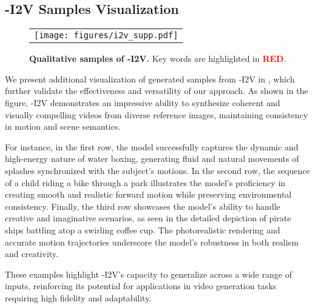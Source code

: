 \subsection{\ours-I2V Samples Visualization}


\begin{figure}[ht]
\begin{center}
\begin{tabular}{c}
\texttt{[image: figures/i2v\_supp.pdf]} \\
\end{tabular}
\end{center}
\caption{\textbf{Qualitative samples of \ours-I2V.} Key words are highlighted in \textcolor{red}{\textbf{RED}}.}
\label{fig:i2v_supp}
\end{figure}


We present additional visualization of generated samples from \ours-I2V in , which further validate the effectiveness and versatility of our approach. As shown in the figure, \ours-I2V demonstrates an impressive ability to synthesize coherent and visually compelling videos from diverse reference images, maintaining consistency in motion and scene semantics.

For instance, in the first row, the model successfully captures the dynamic and high-energy nature of water boxing, generating fluid and natural movements of splashes synchronized with the subject’s motions. In the second row, the sequence of a child riding a bike through a park illustrates the model’s proficiency in creating smooth and realistic forward motion while preserving environmental consistency. Finally, the third row showcases the model’s ability to handle creative and imaginative scenarios, as seen in the detailed depiction of pirate ships battling atop a swirling coffee cup. The photorealistic rendering and accurate motion trajectories underscore the model’s robustness in both realism and creativity.

These examples highlight \ours-I2V’s capacity to generalize across a wide range of inputs, reinforcing its potential for applications in video generation tasks requiring high fidelity and adaptability.
